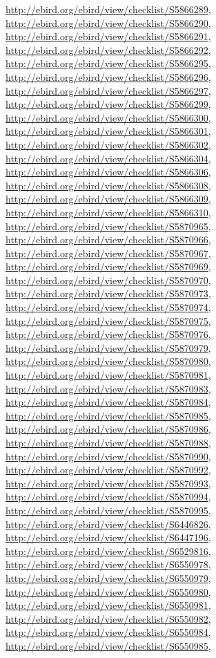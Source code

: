 \documentclass[9pt, article]{memoir}
\begin{document}
\begin{multicols}{2}
\url{http://ebird.org/ebird/view/checklist/S5866289}, 
\url{http://ebird.org/ebird/view/checklist/S5866290}, 
\url{http://ebird.org/ebird/view/checklist/S5866291}, 
\url{http://ebird.org/ebird/view/checklist/S5866292}, 
\url{http://ebird.org/ebird/view/checklist/S5866295}, 
\url{http://ebird.org/ebird/view/checklist/S5866296}, 
\url{http://ebird.org/ebird/view/checklist/S5866297}, 
\url{http://ebird.org/ebird/view/checklist/S5866299}, 
\url{http://ebird.org/ebird/view/checklist/S5866300}, 
\url{http://ebird.org/ebird/view/checklist/S5866301}, 
\url{http://ebird.org/ebird/view/checklist/S5866302}, 
\url{http://ebird.org/ebird/view/checklist/S5866304}, 
\url{http://ebird.org/ebird/view/checklist/S5866306}, 
\url{http://ebird.org/ebird/view/checklist/S5866308}, 
\url{http://ebird.org/ebird/view/checklist/S5866309}, 
\url{http://ebird.org/ebird/view/checklist/S5866310}, 
\url{http://ebird.org/ebird/view/checklist/S5870965}, 
\url{http://ebird.org/ebird/view/checklist/S5870966}, 
\url{http://ebird.org/ebird/view/checklist/S5870967}, 
\url{http://ebird.org/ebird/view/checklist/S5870969}, 
\url{http://ebird.org/ebird/view/checklist/S5870970}, 
\url{http://ebird.org/ebird/view/checklist/S5870973}, 
\url{http://ebird.org/ebird/view/checklist/S5870974}, 
\url{http://ebird.org/ebird/view/checklist/S5870975}, 
\url{http://ebird.org/ebird/view/checklist/S5870976}, 
\url{http://ebird.org/ebird/view/checklist/S5870979}, 
\url{http://ebird.org/ebird/view/checklist/S5870980}, 
\url{http://ebird.org/ebird/view/checklist/S5870981}, 
\url{http://ebird.org/ebird/view/checklist/S5870983}, 
\url{http://ebird.org/ebird/view/checklist/S5870984}, 
\url{http://ebird.org/ebird/view/checklist/S5870985}, 
\url{http://ebird.org/ebird/view/checklist/S5870986}, 
\url{http://ebird.org/ebird/view/checklist/S5870988}, 
\url{http://ebird.org/ebird/view/checklist/S5870990}, 
\url{http://ebird.org/ebird/view/checklist/S5870992}, 
\url{http://ebird.org/ebird/view/checklist/S5870993}, 
\url{http://ebird.org/ebird/view/checklist/S5870994}, 
\url{http://ebird.org/ebird/view/checklist/S5870995}, 
\url{http://ebird.org/ebird/view/checklist/S6446826}, 
\url{http://ebird.org/ebird/view/checklist/S6447196}, 
\url{http://ebird.org/ebird/view/checklist/S6529816}, 
\url{http://ebird.org/ebird/view/checklist/S6550978}, 
\url{http://ebird.org/ebird/view/checklist/S6550979}, 
\url{http://ebird.org/ebird/view/checklist/S6550980}, 
\url{http://ebird.org/ebird/view/checklist/S6550981}, 
\url{http://ebird.org/ebird/view/checklist/S6550982}, 
\url{http://ebird.org/ebird/view/checklist/S6550984}, 
\url{http://ebird.org/ebird/view/checklist/S6550985}, 

\end{multicols}
\end{document}
